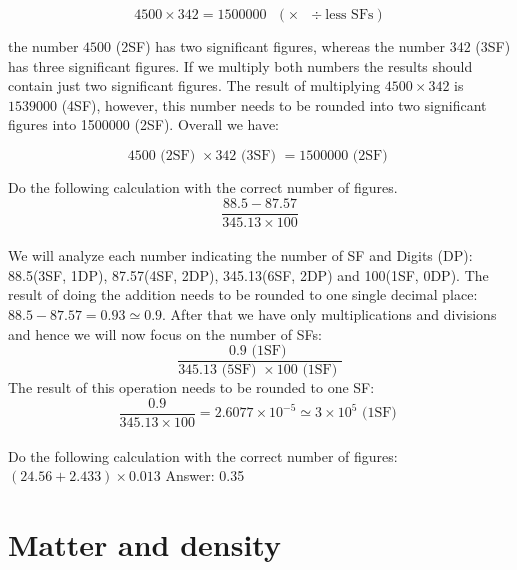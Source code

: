 \documentclass[main.tex]{subfiles}
\begin{document}
\begin{description}
\[4500 \times 342 =1500000\text{ }(\times\text{ }\div \text{less SFs})\]

the number $4500$ (2SF) has two significant figures, whereas the number $342$ (3SF) has three significant figures. If we multiply both numbers the results should contain just two significant figures. The result of multiplying $4500 \times 342$ is $1539000$ (4SF), however, this number needs to be rounded into two significant figures into 1500000 (2SF). Overall we have:

\[4500 \text{ (2SF) } \times 342\text{ (3SF) } =1500000 \text{ (2SF) }\]


\begin{example} %
Do the following calculation with the correct number of figures.
\begin{equation*}
\dfrac{88.5-87.57}{345.13\times100}
\end{equation*}
\\
We will analyze each number indicating the number of SF and Digits (DP): 88.5(3SF, 1DP), 87.57(4SF, 2DP),  345.13(6SF, 2DP) and  100(1SF, 0DP). The result of doing the addition needs to be rounded to one single decimal place: $88.5-87.57=0.93\simeq 0.9$. After that we have only multiplications and divisions and hence we will now focus on the number of SFs:
\begin{equation*}
\dfrac{0.9\text{ (1SF) }}{345.13\text{ (5SF) }\times100\text{ (1SF) }}
\end{equation*}
The result of this operation needs to be rounded to one SF:
\begin{equation*}
\dfrac{0.9}{345.13\times100}=2.6077\times 10^{-5} \simeq 3\times 10^5\text{ (1SF) }
\end{equation*}
\faDiamond\ \\
Do the following calculation with the correct number of figures: $(24.56+2.433)\times0.013$
\flushright Answer: 0.35
\end{example}%





\end{description}
\newpage
\section{Matter and density}
\end{document}
